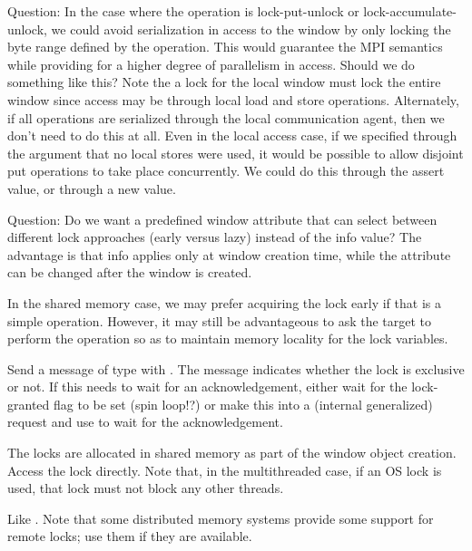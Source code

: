 \documentclass{article}
\begin{document}
Question: In the case where the operation is lock-put-unlock or
lock-accumulate-unlock, we could avoid serialization in access to the window
by only locking the byte range defined by the operation.  This would guarantee
the MPI semantics while providing for a higher degree of parallelism in
access.  Should we do something like this?  Note the a lock for the local
window must lock the entire window since access may be through local
load and store operations.  Alternately, if all operations are serialized
through the local communication agent, then we don't need to do this at all.
Even in the local access case, if we specified through the 
argument that no local stores were used, it would be possible to allow
disjoint put operations to take place concurrently.  We could do this through
the  assert value, or through a new
 value.

Question: Do we want a predefined window attribute that can select between
different lock approaches (early versus lazy) instead of the info value?
The advantage is that info applies only at window creation time, while the
attribute can be changed after the window is created.

In the shared memory case, we may prefer acquiring the lock early if that is a
simple operation.  However, it may still be advantageous to ask the target to
perform the operation so as to maintain memory locality for the lock
variables.

\begin{tcp}
Send a message of type  with
.  The message indicates whether the lock is
exclusive or not.  If this needs to wait for an acknowledgement,
either wait for the lock-granted flag to be set (spin loop!?) or make
this into a (internal generalized) request and use
 to wait for the acknowledgement.
\end{tcp}
\begin{shmem}
The locks are allocated in shared memory as part of the window object
creation.  Access the lock directly.  Note that, in the multithreaded
case, if an OS lock is used, that lock must not block any other threads.
\end{shmem}
\begin{via}
Like \tcpname.  Note that some distributed memory systems provide some
support for remote locks; use them if they are available.
\end{via}
\end{document}
